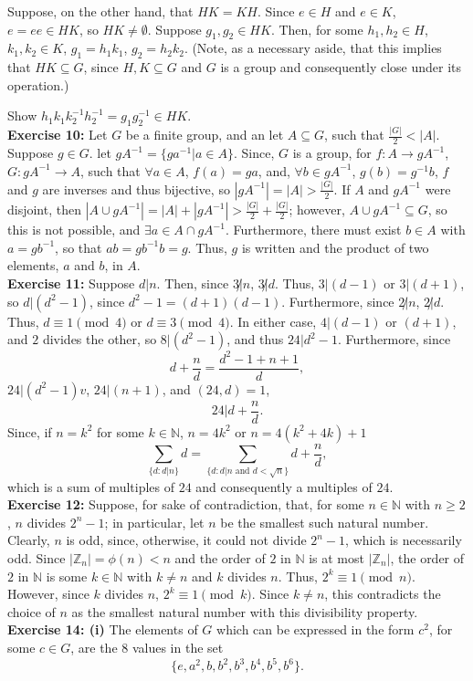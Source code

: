 \documentclass{article}%
\begin{document}
Suppose, on the other hand, that $HK = KH$. Since $e \in H$ and $e \in K$,
$e = ee \in HK$, so $HK \neq \emptyset$. Suppose $g_1, g_2 \in HK$. Then,
for some $h_1, h_2 \in H$, $k_1,k_2 \in K$, $g_1 = h_1k_1$, $g_2 = h_2k_2$.
(Note, as a necessary aside, that this implies that $HK \subseteq G$, since
$H,K \subseteq G$ and $G$ is a group and consequently close under its
operation.)

Show $h_1k_1k_2^{-1}h_2^{-1} = g_1g_2^{-1} \in HK$. \\

\textbf{Exercise 10:} Let $G$ be a finite group, and an let $A \subseteq G$,
such that $\frac{|G|}{2} < |A|$. Suppose $g \in G$. let $gA^{-1} =
\{ga^{-1} | a \in A\}$. Since, $G$ is a group, for $f: A \rightarrow gA^{-1}$,
$G: gA^{-1} \rightarrow A$, such that $\forall a \in A$, $f(a) = ga$, and,
$\forall b \in gA^{-1}$, $g(b) = g^{-1}b$, $f$ and $g$ are inverses and thus
bijective, so $|gA^{-1}| = |A| > \frac{|G|}{2}$. If $A$ and $gA^{-1}$ were
disjoint, then $|A \cup gA^{-1}| = |A| + |gA^{-1}| > \frac{|G|}{2} +
\frac{|G|}{2}$; however, $A \cup gA^{-1} \subseteq G$, so this is not possible,
and $\exists a \in A \cap gA^{-1}$. Furthermore, there must exist $b \in A$
with $a = gb^{-1}$, so that $ab = gb^{-1}b = g$. Thus, $g$ is written and the
product of two elements, $a$ and $b$, in $A$. \\

\textbf{Exercise 11:} Suppose $d | n$. Then, since $3 \not | n$,
$3 \not | d$. Thus, $3 | (d - 1)$ or $3 | (d + 1)$, so
$d | (d^2 - 1)$, since $d^2 - 1 = (d + 1)(d - 1)$. Furthermore, since
$2 \not | n$, $2 \not | d$. Thus, $d \equiv 1 \pmod 4$ or
$d \equiv 3 \pmod 4$. In either case, $4 | (d - 1)$ or $(d + 1)$, and
$2$ divides the other, so $8 | (d^2 - 1)$, and thus $24 |
d^2 - 1$. Furthermore, since
\[d + \frac{n}{d} = \frac{d^2 - 1 + n + 1}{d},\]
$24 | (d^2 - 1)v$, $24 | (n + 1)$, and $(24,d) = 1$,
\[24 | d + \frac{n}{d}.\]
Since, if $n = k^2$ for some $k \in \mathbb{N}$, $n = 4k^2$ or
$n = 4(k^2 +4k) + 1$
\[\sum_{\{d: d | n\}} d =
\sum_{\{d : d | n \mbox{ and } d < \sqrt{n}\}} d + \frac{n}{d},\]
which is a sum of multiples of $24$ and consequently a multiples of $24$.\\

\textbf{Exercise 12:} Suppose, for sake of contradiction, that, for some $n \in
\mathbb{N}$ with
$n \geq 2$, $n$ divides $2^n - 1$; in particular, let $n$ be the smallest such
natural number. Clearly, $n$ is odd, since, otherwise, it could not divide
$2^n - 1$, which is necessarily odd. Since $|\mathbb{Z}_n| = \phi(n) < n$
and the order of $2$ in $\mathbb{N}$ is at most
$|\mathbb{Z}_n|$, the order of $2$ in $\mathbb{N}$ is some $k \in \mathbb{N}$
with $k \neq n$ and $k$ divides $n$. Thus, $2^k \equiv 1 \pmod n$. However,
since $k$ divides $n$, $2^k \equiv 1 \pmod k$. Since $k \neq n$, this
contradicts the choice of $n$ as the smallest natural number with this
divisibility property. \\

\textbf{Exercise 14: (i)} The elements of $G$ which can be expressed in the
form $c^2$, for some $c \in G$, are the $8$ values in the set
\[\{e,a^2,b,b^2,b^3,b^4,b^5,b^6\}.\]
\end{document}
